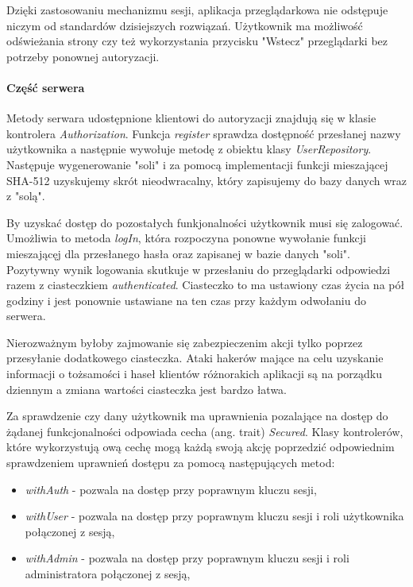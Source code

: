 \documentclass[a4paper,12pt,twoside]{article}
\begin{document}
Dzięki zastosowaniu mechanizmu sesji, aplikacja przeglądarkowa nie odstępuje niczym
od standardów dzisiejszych rozwiązań. 
Użytkownik ma możliwość odświeżania strony czy też wykorzystania przycisku "Wstecz" przeglądarki bez potrzeby ponownej autoryzacji. 

\paragraph{Część serwera}
Metody serwara udostępnione klientowi do autoryzacji
znajdują się w klasie kontrolera \textit{Authorization}.
Funkcja \textit{register} 
sprawdza dostępność przesłanej nazwy użytkownika a następnie wywołuje 
metodę z obiektu klasy \textit{UserRepository}.
Następuje wygenerowanie "soli" i za pomocą implementacji funkcji mieszającej
SHA-512 uzyskujemy skrót nieodwracalny, który zapisujemy do bazy danych wraz z "solą".

By uzyskać dostęp do pozostałych funkjonalności użytkownik musi się zalogować.
Umożliwia to metoda \textit{logIn}, która rozpoczyna ponowne wywołanie
funkcji mieszającęj dla przesłanego hasła oraz zapisanej w bazie danych "soli". Pozytywny wynik logowania skutkuje w przesłaniu do przeglądarki
odpowiedzi razem z ciasteczkiem \textit{authenticated}.
Ciasteczko to ma ustawiony czas życia na pół godziny i jest ponownie 
ustawiane na ten czas przy każdym odwołaniu do serwera.
 
Nierozważnym byłoby zajmowanie się zabezpieczenim akcji 
tylko poprzez przesyłanie dodatkowego ciasteczka. 
Ataki hakerów mające na celu uzyskanie informacji o tożsamości i haseł
klientów różnorakich aplikacji są na porządku dziennym a zmiana
wartości ciasteczka jest bardzo łatwa.

\newpage
Za sprawdzenie czy dany użytkownik ma uprawnienia pozalające 
na dostęp do żądanej funkcjonalności odpowiada
cecha (ang. trait) \textit{Secured}.
Klasy kontrolerów, które wykorzystują ową cechę mogą każdą
swoją akcję poprzedzić odpowiednim sprawdzeniem uprawnień dostępu
za pomocą następujących metod: 
\begin{itemize}
\item \textit{withAuth} - pozwala na dostęp przy poprawnym kluczu sesji,
\item \textit{withUser} - pozwala na dostęp przy poprawnym kluczu sesji i roli użytkownika połączonej z sesją,
\item \textit{withAdmin} - pozwala na dostęp przy poprawnym kluczu sesji i roli administratora połączonej z sesją,
\end{itemize}
\end{document}

